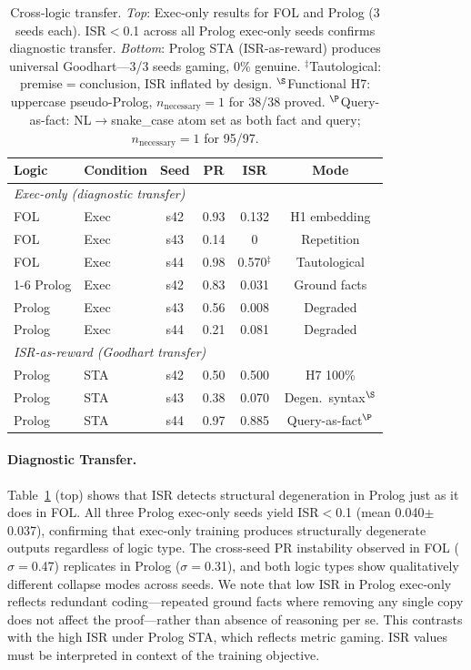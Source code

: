 \begin{table}[t]
\centering
\small
\setlength{\tabcolsep}{3pt}
\begin{tabular}{llcccc}
\toprule
\textbf{Logic} & \textbf{Condition} & \textbf{Seed} & \textbf{PR} & \textbf{ISR} & \textbf{Mode} \\
\midrule
\multicolumn{6}{l}{\textit{Exec-only (diagnostic transfer)}} \\
FOL & Exec & s42 & 0.93 & 0.132 & H1 embedding \\
FOL & Exec & s43 & 0.14 & 0 & Repetition \\
FOL & Exec & s44 & 0.98 & 0.570$^\ddagger$ & Tautological \\
\cmidrule{1-6}
Prolog & Exec & s42 & 0.83 & 0.031 & Ground facts \\
Prolog & Exec & s43 & 0.56 & 0.008 & Degraded \\
Prolog & Exec & s44 & 0.21 & 0.081 & Degraded \\
\midrule
\multicolumn{6}{l}{\textit{ISR-as-reward (Goodhart transfer)}} \\
Prolog & STA & s42 & 0.50 & 0.500 & H7 100\% \\
Prolog & STA & s43 & 0.38 & 0.070 & Degen.\ syntax$^\S$ \\
Prolog & STA & s44 & 0.97 & 0.885 & Query-as-fact$^\P$ \\
\bottomrule
\end{tabular}
\caption{Cross-logic transfer. \textit{Top}: Exec-only results for FOL and Prolog (3 seeds each). ISR$<$0.1 across all Prolog exec-only seeds confirms diagnostic transfer. \textit{Bottom}: Prolog STA (ISR-as-reward) produces universal Goodhart---3/3 seeds gaming, 0\% genuine. $^\ddagger$Tautological: premise$=$conclusion, ISR inflated by design. $^\S$Functional H7: uppercase pseudo-Prolog, $n_{\text{necessary}}{=}1$ for 38/38 proved. $^\P$Query-as-fact: NL$\to$snake\_case atom set as both fact and query; $n_{\text{necessary}}{=}1$ for 95/97.}
\label{tab:prolog-crosslogic}
\end{table}

\paragraph{Diagnostic Transfer.}
Table~\ref{tab:prolog-crosslogic} (top) shows that ISR detects structural degeneration in Prolog just as it does in FOL. All three Prolog exec-only seeds yield ISR$<$0.1 (mean 0.040$\pm$0.037), confirming that exec-only training produces structurally degenerate outputs regardless of logic type. The cross-seed PR instability observed in FOL ($\sigma{=}$0.47) replicates in Prolog ($\sigma{=}$0.31), and both logic types show qualitatively different collapse modes across seeds.
We note that low ISR in Prolog exec-only reflects redundant coding---repeated ground facts where removing any single copy does not affect the proof---rather than absence of reasoning per se. This contrasts with the high ISR under Prolog STA, which reflects metric gaming. ISR values must be interpreted in context of the training objective.

